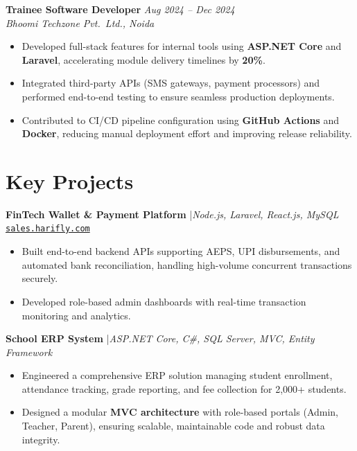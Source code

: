 \documentclass[11pt, a4paper]{article}
\begin{document}
\vspace{4pt}

\textbf{Trainee Software Developer} \hfill \textit{Aug 2024 -- Dec 2024} \\
\textit{Bhoomi Techzone Pvt.\ Ltd., Noida}
\begin{itemize}
  \item Developed full-stack features for internal tools using \textbf{ASP.NET Core} and \textbf{Laravel}, accelerating module delivery timelines by \textbf{20\%}.
  \item Integrated third-party APIs (SMS gateways, payment processors) and performed end-to-end testing to ensure seamless production deployments.
  \item Contributed to CI/CD pipeline configuration using \textbf{GitHub Actions} and \textbf{Docker}, reducing manual deployment effort and improving release reliability.
\end{itemize}

\section*{Key Projects}

\textbf{FinTech Wallet \& Payment Platform} \enspace|\enspace \textit{Node.js, Laravel, React.js, MySQL} \hfill \href{https://sales.harifly.com}{\small\texttt{sales.harifly.com}}
\begin{itemize}
  \item Built end-to-end backend APIs supporting AEPS, UPI disbursements, and automated bank reconciliation, handling high-volume concurrent transactions securely.
  \item Developed role-based admin dashboards with real-time transaction monitoring and analytics.
\end{itemize}

\vspace{3pt}

\textbf{School ERP System} \enspace|\enspace \textit{ASP.NET Core, C\#, SQL Server, MVC, Entity Framework}
\begin{itemize}
  \item Engineered a comprehensive ERP solution managing student enrollment, attendance tracking, grade reporting, and fee collection for 2,000+ students.
  \item Designed a modular \textbf{MVC architecture} with role-based portals (Admin, Teacher, Parent), ensuring scalable, maintainable code and robust data integrity.
\end{itemize}
\end{document}
